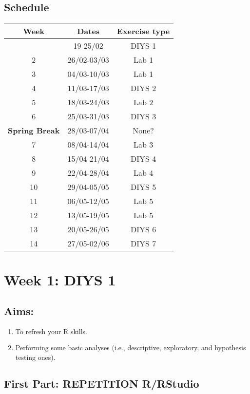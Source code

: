 \documentclass[
]{book}
\providecommand{\tightlist}{%
  \setlength{\itemsep}{0pt}\setlength{\parskip}{0pt}}
\begin{document}
\hypertarget{schedule}{%
\section{Schedule}\label{schedule}}

\begin{longtable}[]{@{}ccc@{}}
\toprule\noalign{}
Week & Dates & Exercise type \\
\midrule\noalign{}
\endhead
\bottomrule\noalign{}
\endlastfoot
1 & 19-25/02 & DIYS 1 \\
2 & 26/02-03/03 & Lab 1 \\
3 & 04/03-10/03 & Lab 1 \\
4 & 11/03-17/03 & DIYS 2 \\
5 & 18/03-24/03 & Lab 2 \\
6 & 25/03-31/03 & DIYS 3 \\
\textbf{Spring Break} & 28/03-07/04 & None? \\
7 & 08/04-14/04 & Lab 3 \\
8 & 15/04-21/04 & DIYS 4 \\
9 & 22/04-28/04 & Lab 4 \\
10 & 29/04-05/05 & DIYS 5 \\
11 & 06/05-12/05 & Lab 5 \\
12 & 13/05-19/05 & Lab 5 \\
13 & 20/05-26/05 & DIYS 6 \\
14 & 27/05-02/06 & DIYS 7 \\
\end{longtable}

\hypertarget{week-1-diys-1}{%
\chapter{Week 1: DIYS 1}\label{week-1-diys-1}}

\hypertarget{aims}{%
\section{Aims:}\label{aims}}

\begin{enumerate}
\def\labelenumi{\arabic{enumi}.}
\tightlist
\item
  To refresh your R skills.
\item
  Performing some basic analyses (i.e., descriptive, exploratory, and hypothesis testing ones).
\end{enumerate}

\hypertarget{first-part-repetition-rrstudio}{%
\section{First Part: REPETITION R/RStudio}\label{first-part-repetition-rrstudio}}
\end{document}
